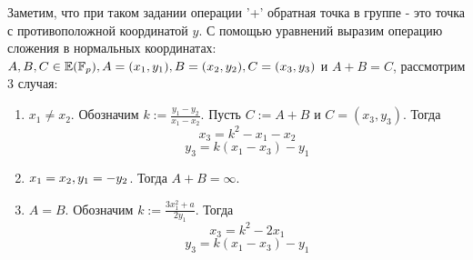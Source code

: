 \documentclass{article}
\begin{document}
    Заметим, что при таком задании операции '+' обратная точка в группе - это точка с противоположной координатой $y$. С помощью уравнений выразим операцию сложения в нормальных координатах: $A,B,C\in \E(\F_p),\q A=(x_1,y_1),\q B=(x_2,y_2), \q C=(x_3,y_3)$ и $A + B = C$, рассмотрим 3 случая: 
    \begin{enumerate}
      \item $x_1\neq x_2$. Обозначим $k := \frac{y_1-y_2}{x_1-x_2}$. Пусть $C:=A+B$ и $C=(x_3,y_3)$. Тогда
      \[x_3 = k^2 - x_1 - x_2\]
      \[y_3 = k(x_1 - x_3) - y_1\]
      \item $x_1 = x_2,\q y_1 = -y_2$. Тогда $A+B = \infty$.
      \item $A = B$. Обозначим $k := \frac{3x_1^2 + a}{2y_1}$. Тогда
      \[x_3 = k^2 - 2x_1\]
      \[y_3 = k(x_1 - x_3) - y_1\]
    \end{enumerate}
\end{document}
